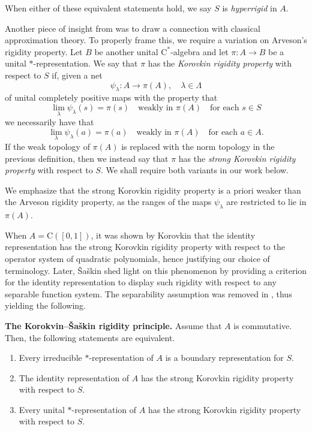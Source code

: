 \documentclass[10pt]{amsart}
\newcommand{\rC}{\mathrm{C}}
\theoremstyle{definition}
\begin{document}
\vspace{3mm}

When either of these equivalent statements hold, we say $S$ is \emph{hyperrigid} in $A$.

Another piece of insight from \cite{arveson2011noncommutative} was to draw a connection with classical approximation theory. To properly frame this, we require a variation on Arveson's rigidity property. Let $B$ be another unital $\rC^*$-algebra and let $\pi:A\to B$ be a unital $*$-representation. We say that $\pi$ has the \emph{Korovkin rigidity property} with respect to $S$ if, given a net
\[
\psi_\lambda:A\to \pi(A),\quad \lambda\in \Lambda
\]
of unital completely positive maps with the property that 
\[
\lim_{\lambda} \psi_\lambda(s)=\pi(s) \quad \text{weakly in } \pi(A) \quad \text{for each } s\in S
\]
we necessarily have that 
\[
\lim_{\lambda} \psi_\lambda(a)=\pi(a) \quad \text{weakly in } \pi(A) \quad \text{for each } a\in A.
\]
If the weak topology of $\pi(A)$ is replaced with the norm topology in the previous definition, then we instead say that $\pi$ has the \emph{strong Korovkin rigidity property} with respect to $S$. We shall require both variants in our work below.


We emphasize that the strong Korovkin rigidity property is a priori weaker than the Arveson rigidity property, as the ranges of the maps $\psi_\lambda$ are restricted to lie in $\pi(A)$.  

When $A=\rC([0,1])$, it was shown by Korovkin \cite{korovkin1953convergence} that the identity representation has the strong Korovkin rigidity property with respect to the operator system of quadratic polynomials, hence justifying our choice of terminology. Later,  \v{S}a\v{s}kin \cite{vsavskin1967mil} shed light on this phenomenon by providing a criterion for the identity representation to display such rigidity with respect to any separable  function system. The separability assumption was removed in \cite[Theorem 5.3]{davidson2021choquet}, thus yielding the following.

\vspace{3mm}

\noindent \textbf{The Korokvin--\v{S}a\v{s}kin rigidity principle. }
Assume that $A$ is commutative. Then, the following statements are equivalent.
\begin{enumerate}[\rm (i)]
\item Every irreducible $*$-representation of $A$ is a boundary representation for $S$.
\item The identity representation of $A$ has the strong Korovkin rigidity property with respect to $S$.
\item Every unital $*$-representation of $A$ has  the strong Korovkin rigidity property with respect to $S$.
\end{enumerate}
\end{document}
